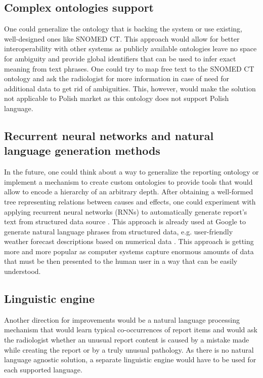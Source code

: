 \documentclass[12pt, twoside, openany]{report}
\theoremstyle{definition}
\begin{document}
\subsection{Complex ontologies support}
One could generalize the ontology that is backing the system or use existing, well-designed ones like SNOMED CT. This approach would allow for better interoperability with other systems as publicly available ontologies leave no space for ambiguity and provide global identifiers that can be used to infer exact meaning from text phrases. One could try to map free text to the SNOMED CT ontology and ask the radiologist for more information in case of need for additional data to get rid of ambiguities. This, however, would make the solution not applicable to Polish market as this ontology does not support Polish language. 

\subsection{Recurrent neural networks and natural language generation methods}
In the future, one could think about a way to generalize the reporting ontology or implement a mechanism to create custom ontologies to provide tools that would allow to encode a hierarchy of an arbitrary depth. After obtaining a well-formed tree representing relations between causes and effects, one could experiment with applying recurrent neural networks (RNNs) to automatically generate report's text from structured data source \cite{recurrent-neural-networks}. This approach is already used at Google to generate natural language phrases from structured data, e.g. user-friendly weather forecast descriptions based on numerical data \cite{recurrent-neural-networks-google}. This approach is getting more and more popular as computer systems capture enormous amounts of data that must be then presented to the human user in a way that can be easily understood.
\subsection{Linguistic engine}
Another direction for improvements would be a natural language processing mechanism that would learn typical co-occurrences of report items and would ask the radiologist whether an unusual report content is caused by a mistake made while creating the report or by a truly unusual pathology. As there is no natural language agnostic solution, a separate linguistic engine would have to be used for each supported language. 
\end{document}
